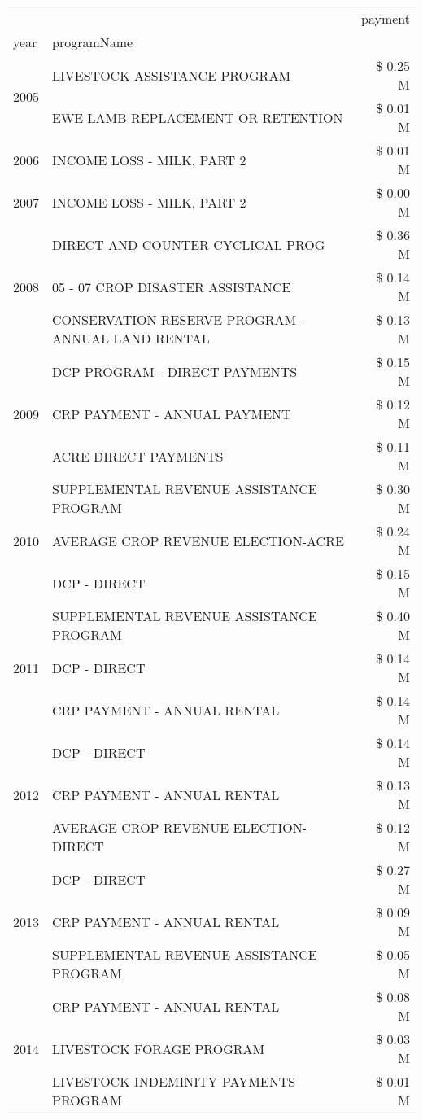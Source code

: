 \begin{tabular}{llr}
\toprule
 &  & payment \\
year & programName &  \\
\midrule
\multirow[t]{2}{*}{2005} & LIVESTOCK ASSISTANCE PROGRAM & \$ 0.25 M \\
 & EWE LAMB REPLACEMENT OR RETENTION & \$ 0.01 M \\
\cline{1-3}
2006 & INCOME LOSS - MILK, PART 2 & \$ 0.01 M \\
\cline{1-3}
2007 & INCOME LOSS - MILK, PART 2 & \$ 0.00 M \\
\cline{1-3}
\multirow[t]{3}{*}{2008} & DIRECT AND COUNTER CYCLICAL PROG & \$ 0.36 M \\
 & 05 - 07 CROP DISASTER ASSISTANCE & \$ 0.14 M \\
 & CONSERVATION RESERVE PROGRAM - ANNUAL LAND RENTAL & \$ 0.13 M \\
\cline{1-3}
\multirow[t]{3}{*}{2009} & DCP PROGRAM - DIRECT PAYMENTS & \$ 0.15 M \\
 & CRP PAYMENT - ANNUAL PAYMENT & \$ 0.12 M \\
 & ACRE DIRECT PAYMENTS & \$ 0.11 M \\
\cline{1-3}
\multirow[t]{3}{*}{2010} & SUPPLEMENTAL REVENUE ASSISTANCE PROGRAM & \$ 0.30 M \\
 & AVERAGE CROP REVENUE ELECTION-ACRE & \$ 0.24 M \\
 & DCP - DIRECT & \$ 0.15 M \\
\cline{1-3}
\multirow[t]{3}{*}{2011} & SUPPLEMENTAL REVENUE ASSISTANCE PROGRAM & \$ 0.40 M \\
 & DCP - DIRECT & \$ 0.14 M \\
 & CRP PAYMENT - ANNUAL RENTAL & \$ 0.14 M \\
\cline{1-3}
\multirow[t]{3}{*}{2012} & DCP - DIRECT & \$ 0.14 M \\
 & CRP PAYMENT - ANNUAL RENTAL & \$ 0.13 M \\
 & AVERAGE CROP REVENUE ELECTION-DIRECT & \$ 0.12 M \\
\cline{1-3}
\multirow[t]{3}{*}{2013} & DCP - DIRECT & \$ 0.27 M \\
 & CRP PAYMENT - ANNUAL RENTAL & \$ 0.09 M \\
 & SUPPLEMENTAL REVENUE ASSISTANCE PROGRAM & \$ 0.05 M \\
\cline{1-3}
\multirow[t]{3}{*}{2014} & CRP PAYMENT - ANNUAL RENTAL & \$ 0.08 M \\
 & LIVESTOCK FORAGE PROGRAM & \$ 0.03 M \\
 & LIVESTOCK INDEMINITY PAYMENTS PROGRAM & \$ 0.01 M \\

\end{tabular}
